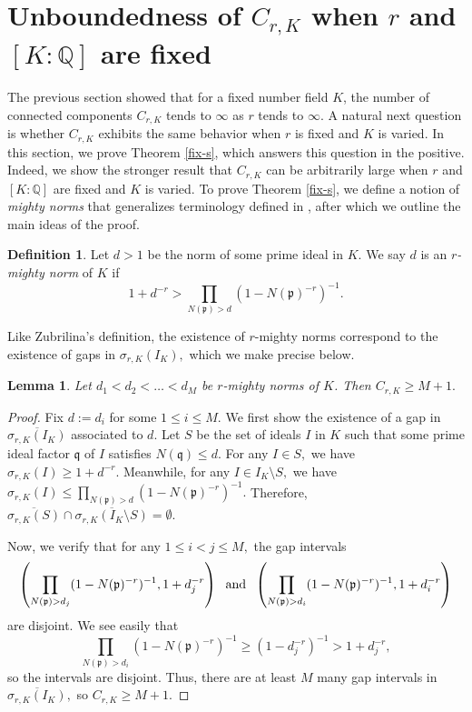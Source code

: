 \documentclass[12pt]{amsart}
\newtheorem{lemma}[theorem]{Lemma}
\theoremstyle{definition}
\newtheorem{definition}[theorem]{Definition}
\numberwithin{equation}{section}
\newcommand{\Q}{\mathbb{Q}}
\begin{document}
\section{Unboundedness of $C_{r,K}$ when $r$ and $[K:\Q]$ are fixed}\label{section-last}




The previous section showed that for a fixed number field $K$, the number of connected components $C_{r,K}$ tends to $\infty$ as $r$ tends to $\infty.$ A natural next question is whether $C_{r,K}$ exhibits the same behavior when $r$ is fixed and $K$ is varied. In this section, we prove Theorem \ref{fix-s}, which answers this question in the positive. Indeed, we show the stronger result that $C_{r,K}$ can be arbitrarily large when $r$ and $[K:\Q]$ are fixed and $K$ is varied.
To prove Theorem \ref{fix-s}, we define a notion of \textit{mighty norms} that generalizes terminology defined in \cite{Z18}, after which we outline the main ideas of the proof.  

\begin{definition}
    Let $d > 1$ be the norm of some prime ideal in $K$. We say $d$ is an \textit{$r$-mighty norm} of $K$ if \begin{equation} \label{mighty}
        1 + d^{-r} > \prod_{N(\mathfrak p) > d} (1 - N(\mathfrak p)^{-r})^{-1}.
    \end{equation}
\end{definition}

Like Zubrilina's definition, the existence of $r$-mighty norms correspond to the existence of gaps in $\sigma_{r,K}(I_K),$ which we make precise below. 

\begin{lemma}\label{lemma-gaps}
    Let $d_1 < d_2 < \dots < d_M$ be $r$-mighty norms of $K$. Then $C_{r, K} \geq M+1.$
\end{lemma}

\begin{proof}
    Fix $d := d_i$ for some $1 \leq i \leq M.$ We first show the existence of a gap in $\overline{\sigma_{r,K}(I_K)}$ associated to $d$. Let $S$ be the set of ideals $I$ in $K$ such that some prime ideal factor $\mathfrak q$ of $I$ satisfies $N(\mathfrak q) \leq d.$ For any $I \in S,$ we have $\sigma_{r,K}(I) \geq 1+d^{-r}.$ Meanwhile, for any $I \in I_K \setminus S,$ we have $\sigma_{r,K}(I) \leq \prod_{N(\mathfrak p) > d} (1 - N(\mathfrak p)^{-r})^{-1}.$ Therefore, $\overline{\sigma_{r,K}(S)} \cap \overline{\sigma_{r,K}(I_K \setminus S)} = \emptyset.$ 

    Now, we verify that for any $1 \leq i < j \leq M,$ the gap intervals $$\left( \prod_{N(\mathfrak p) > d_j} (1 - N(\mathfrak p)^{-r})^{-1}, 1 + d_j^{-r} \right) \text{\; and \;} \left( \prod_{N(\mathfrak p) > d_i} (1 - N(\mathfrak p)^{-r})^{-1}, 1 + d_i^{-r} \right)$$ are disjoint. We see easily that $$\prod_{N(\mathfrak p) > d_i} (1 - N(\mathfrak p)^{-r})^{-1} \geq (1 - d_j^{-r})^{-1} > 1 + d_j^{-r},$$ so the intervals are disjoint. Thus, there are at least $M$ many gap intervals in $\overline{\sigma_{r,K}(I_K)},$ so $C_{r,K} \geq M+1.$
\end{proof}
\end{document}
